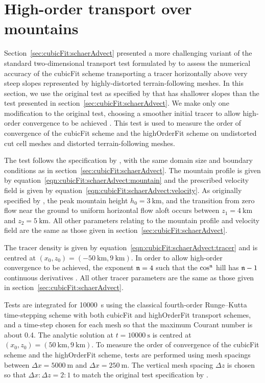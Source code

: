 \section{High-order transport over mountains}
\label{sec:highOrderFit:schaerAdvectSmooth}

Section~\ref{sec:cubicFit:schaerAdvect} presented a more challenging variant of the standard two-dimensional transport test formulated by \citet{schaer2002} to assess the numerical accuracy of the cubicFit scheme transporting a tracer horizontally above very steep slopes represented by highly-distorted terrain-following meshes.
In this section, we use the original test as specified by \citet{schaer2002} that has shallower slopes than the test presented in section~\ref{sec:cubicFit:schaerAdvect}.
We make only one modification to the original test, choosing a smoother initial tracer to allow high-order convergence to be achieved \citep{holdaway2008}.
This test is used to measure the order of convergence of the cubicFit scheme and the highOrderFit scheme on undistorted cut cell meshes and distorted terrain-following meshes.

The test follows the specification by \citet{schaer2002}, with the same domain size and boundary conditions as in section~\ref{sec:cubicFit:schaerAdvect}.
The mountain profile is given by equation~\eqref{eqn:cubicFit:schaerAdvect:mountain} and the prescribed velocity field is given by equation~\eqref{eqn:cubicFit:schaerAdvect:velocity}.
As originally specified by \citet{schaer2002}, the peak mountain height $h_0 = \SI{3}{\kilo\meter}$, and the transition from zero flow near the ground to uniform horizontal flow aloft occurs between $z_1 = \SI{4}{\kilo\meter}$ and $z_2 = \SI{5}{\kilo\meter}$.
All other parameters relating to the mountain profile and velocity field are the same as those given in section~\ref{sec:cubicFit:schaerAdvect}.

The tracer density is given by equation~\eqref{eqn:cubicFit:schaerAdvect:tracer} and is centred at $(x_0, z_0) = (\SI{-50}{\kilo\meter}, \SI{9}{\kilo\meter})$.  In order to allow high-order convergence to be achieved, the exponent $\mathfrak{n} = 4$ such that the $\cos^{\mathfrak{n}}$ hill has $\mathfrak{n} - 1$ continuous derivatives \citep{holdaway2008}.
All other tracer parameters are the same as those given in section~\ref{sec:cubicFit:schaerAdvect}.

Tests are integrated for \SI{10000}{\second} using the classical fourth-order Runge–Kutta time-stepping scheme with both cubicFit and highOrderFit transport schemes, and a time-step chosen for each mesh so that the maximum Courant number is about \num{0.4}.  
The analytic solution at $t = \SI{10000}{\second}$ is centred at $(x_0, z_0) = (\SI{50}{\kilo\meter}, \SI{9}{\kilo\meter})$.
To measure the order of convergence of the cubicFit scheme and the highOrderFit scheme, tests are performed using mesh spacings between $\Delta x = \SI{5000}{\meter}$ and $\Delta x = \SI{250}{\meter}$.
The vertical mesh spacing $\Delta z$ is chosen so that $\Delta x \mathbin{:} \Delta z = 2\mathbin{:}1$ to match the original test specification by \citet{schaer2002}.

